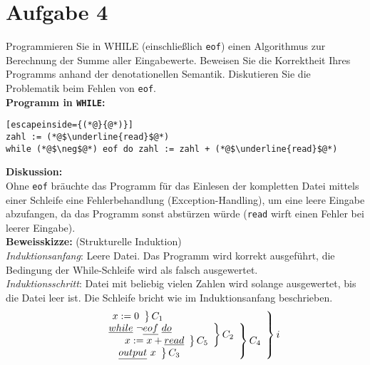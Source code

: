 \documentclass[ngerman,a4paper]{report}
\begin{document}
\section*{Aufgabe 4}
Programmieren Sie in WHILE (einschließlich \lstinline!eof!) einen Algorithmus zur Berechnung der Summe aller Eingabewerte. Beweisen Sie die Korrektheit Ihres Programms anhand der denotationellen Semantik. Diskutieren Sie die Problematik beim Fehlen von \lstinline!eof!.\\
\textbf{Programm in \texttt{WHILE}:}\\
\begin{lstlisting}[escapeinside={(*@}{@*)}]
zahl := (*@$\underline{read}$@*)
while (*@$\neg$@*) eof do zahl := zahl + (*@$\underline{read}$@*)
\end{lstlisting}

\textbf{Diskussion:}\\
Ohne \lstinline$eof$ bräuchte das Programm für das Einlesen der kompletten Datei mittels einer Schleife eine Fehlerbehandlung (Exception-Handling), um eine leere Eingabe abzufangen, da das Programm sonst abstürzen würde (\lstinline$read$ wirft einen Fehler bei leerer Eingabe).\\

\textbf{Beweisskizze:} (Strukturelle Induktion)\\
\emph{Induktionsanfang}: Leere Datei. Das Programm wird korrekt ausgeführt, die Bedingung der While-Schleife wird als falsch ausgewertet.\\
\emph{Induktionsschritt}: Datei mit beliebig vielen Zahlen wird solange ausgewertet, bis die Datei leer ist. Die Schleife bricht wie im Induktionsanfang beschrieben.\\
\begin{align*}
\left. \begin{array}{l l}
\left. \begin{array}{l l} &x:=0 \end{array}\right\} C_1\\
\left. \begin{array}{l l}
\left. \begin{array}{l l} \underline{while}\ \lnot \underline{eof}\ \underline{do} \\ \left. \begin{array}{l l} &x:=x+\underline{read} \end{array}\right\} C_5\end{array}\right\} C_2\\
\left. \begin{array}{l l} &\underline{output}\ x \end{array}\right\} C_3\\\end{array}\right\} C_4\\ \end{array}\right\} i\\
\end{align*}
\end{document}
